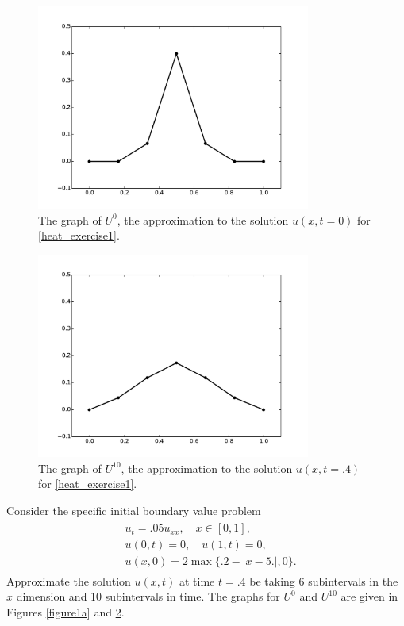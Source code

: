 \begin{figure}[ht]
\centering
\includegraphics[width=9cm]{heatexercise1a.pdf}
\caption{The graph of $U^{0}$, the approximation to the solution $u(x,t=0)$ for \ref{heat_exercise1}.}
\label{figure1a}
\end{figure}

\begin{figure}[ht]
\centering
\includegraphics[width=9cm]{heatexercise1b.pdf}
\caption{The graph of $U^{10}$, the approximation to the solution $u(x,t=.4)$ for \ref{heat_exercise1}.}
\label{figure1b}
\end{figure}


\begin{problem}
	Consider the specific initial boundary value problem
	\begin{align}
		\begin{split}
		&{ } u_t = .05 u_{xx}, \quad x \in [0,1], \\
		&{ } u(0,t) = 0,\quad u(1,t) = 0,\\
		&{ } u(x,0) = 2\max\{.2 - |x-5.|,0\}.
		\end{split}\label{heat_exercise1}
	\end{align}
	Approximate the solution $u(x,t)$ at time $t = .4$ be taking 6 subintervals in the $x$ dimension and 10 subintervals in time. 
	The graphs for $U^0$ and $U^{10}$ are given in Figures \eqref{figure1a} and \ref{figure1b}.
\end{problem}


